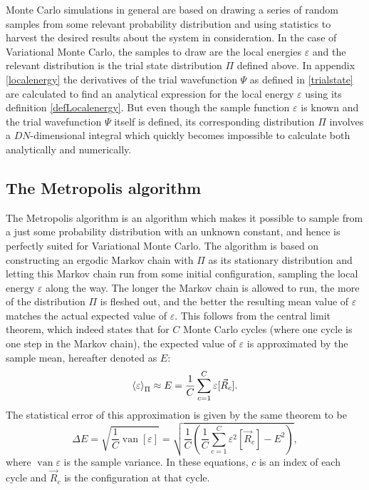 \documentclass[a4paper,8pt]{article}
\DeclareMathOperator{\van}{van}
\begin{document}
\begin{multicols}{2}
Monte Carlo simulations in general are based on drawing a series of random samples from some relevant probability distribution and using statistics to harvest the desired results about the system in consideration. In the case of Variational Monte Carlo, the samples to draw are the local energies $\varepsilon$ and the relevant distribution is the trial state distribution $\Pi$ defined above. In appendix \ref{localenergy} the derivatives of the trial wavefunction $\Psi$ as defined in \eqref{trialstate} are calculated to find an analytical expression for the local energy $\varepsilon$ using its definition \eqref{defLocalenergy}. But even though the sample function $\varepsilon$ is known and the trial wavefunction $\Psi$ itself is defined, its corresponding distribution $\Pi$ involves a $DN$-dimensional integral which quickly becomes impossible to calculate both analytically and numerically.


\subsection{The Metropolis algorithm} \label{Metropolis}
The Metropolis algorithm is an algorithm which makes it possible to sample from a just some probability distribution with an unknown constant, and hence is perfectly suited for Variational Monte Carlo. The algorithm is based on constructing an ergodic Markov chain with $\Pi$ as its stationary distribution and letting this Markov chain run from some initial configuration, sampling the local energy $\varepsilon$ along the way. The longer the Markov chain is allowed to run, the more of the distribution $\Pi$ is fleshed out, and the better the resulting mean value of $\varepsilon$ matches the actual expected value of $\varepsilon$. This follows from the central limit theorem, which indeed states that for $C$ Monte Carlo cycles (where one cycle is one step in the Markov chain), the expected value of $\varepsilon$ is approximated by the sample mean, hereafter denoted as $E$:
\begin{equation}
\ev{\varepsilon}_\Pi \approx E = \frac{1}{C}\sum\limits_{c = 1}^C \varepsilon[\vec{R}_c]. \label{mean}
\end{equation}
The statistical error of this approximation is given by the same theorem to be
\begin{equation} 
\Delta E = \sqrt{\frac{1}{C} \van[\varepsilon]} = \sqrt{\frac{1}{C}\left(\frac{1}{C}\sum\limits_{c = 1}^C \varepsilon^2[\vec{R}_c] - E^2\right)}, \label{error}
\end{equation}
where $\van\varepsilon$ is the sample variance. In these equations, $c$ is an index of each cycle and $\vec{R}_c$ is the configuration at that cycle.


\end{multicols}
\end{document}
